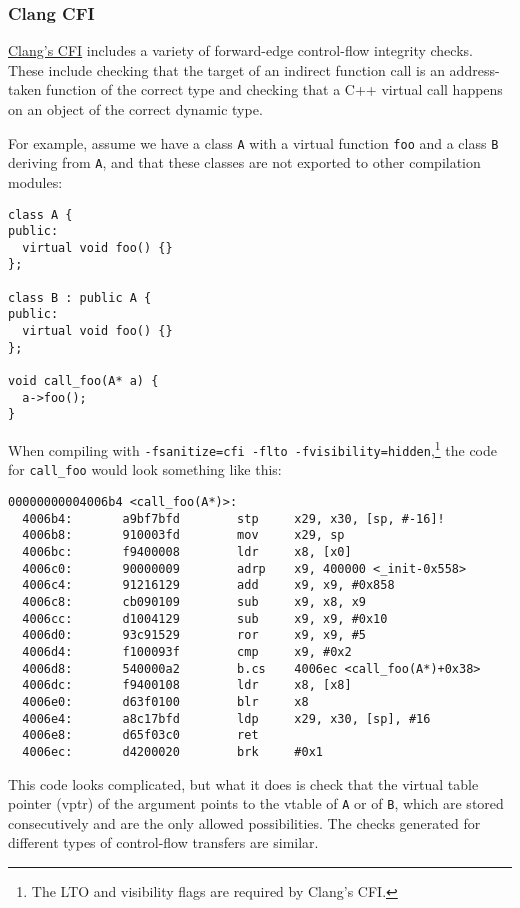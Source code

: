 \documentclass[a4paper,]{report}
\begin{document}
\hypertarget{clang-cfi}{%
\subsubsection{Clang CFI}\label{clang-cfi}}

\href{https://clang.llvm.org/docs/ControlFlowIntegrity.html}{Clang's
CFI} includes a variety of forward-edge control-flow integrity checks.
These include checking that the target of an indirect function call is
an address-taken function of the correct type and checking that a C++
virtual call happens on an object of the correct dynamic type.

For example, assume we have a class \texttt{A} with a virtual function
\texttt{foo} and a class \texttt{B} deriving from \texttt{A}, and that
these classes are not exported to other compilation modules:

\begin{verbatim}
class A {
public:
  virtual void foo() {}
};

class B : public A {
public:
  virtual void foo() {}
};

void call_foo(A* a) {
  a->foo();
}
\end{verbatim}

When compiling with
\texttt{-fsanitize=cfi\ -flto\ -fvisibility=hidden},\footnote{The LTO
  and visibility flags are required by Clang's CFI.} the code for
\texttt{call\_foo} would look something like this:

\begin{verbatim}
00000000004006b4 <call_foo(A*)>:
  4006b4:       a9bf7bfd        stp     x29, x30, [sp, #-16]!
  4006b8:       910003fd        mov     x29, sp
  4006bc:       f9400008        ldr     x8, [x0]
  4006c0:       90000009        adrp    x9, 400000 <_init-0x558>
  4006c4:       91216129        add     x9, x9, #0x858
  4006c8:       cb090109        sub     x9, x8, x9
  4006cc:       d1004129        sub     x9, x9, #0x10
  4006d0:       93c91529        ror     x9, x9, #5
  4006d4:       f100093f        cmp     x9, #0x2
  4006d8:       540000a2        b.cs    4006ec <call_foo(A*)+0x38>
  4006dc:       f9400108        ldr     x8, [x8]
  4006e0:       d63f0100        blr     x8
  4006e4:       a8c17bfd        ldp     x29, x30, [sp], #16
  4006e8:       d65f03c0        ret
  4006ec:       d4200020        brk     #0x1
\end{verbatim}

This code looks complicated, but what it does is check that the virtual
table pointer (vptr) of the argument points to the vtable of \texttt{A}
or of \texttt{B}, which are stored consecutively and are the only
allowed possibilities. The checks generated for different types of
control-flow transfers are similar.
\end{document}
